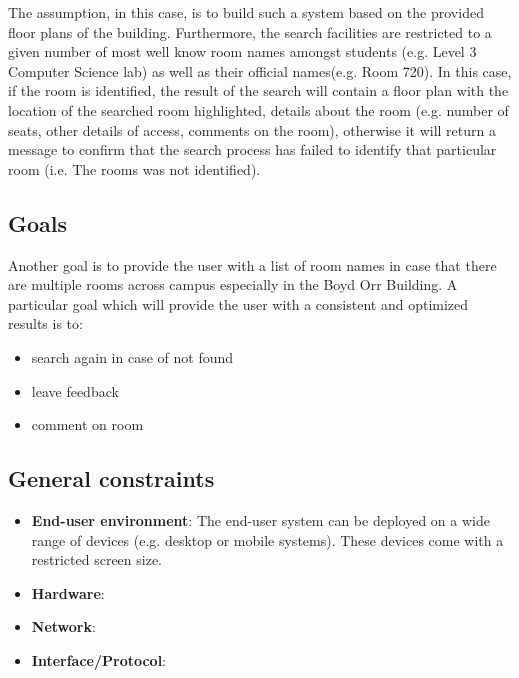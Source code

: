 \documentclass{sig-alt-release2}
\begin{document}
The assumption, in this case, is to build such a system based on the provided
floor plans of the building. Furthermore, the search facilities are restricted
to a given number of most well know room names amongst students (e.g. Level 3
Computer Science lab) as well as their official names(e.g. Room 720). In this
case, if the room is identified, the result of the search will contain a floor
plan with the location of the searched room highlighted, details about the
room (e.g. number of seats, other details of access, comments on the room),
otherwise it will return a message to confirm that the search process has
failed to identify that particular room (i.e. The rooms was not identified).

\subsection{Goals}
Another goal is to provide the user with a list of room names in case that
there are multiple rooms across campus especially in the Boyd Orr Building.
A particular goal which will provide the user with a consistent and optimized
results is to:
\begin{itemize}
	\item  search again in case of not found 
	\item  leave feedback
	\item  comment on room 
\end{itemize}

\subsection{General constraints}
\begin{itemize}
	\item \textbf{End-user environment}: The end-user system can be deployed
	on a wide range of devices (e.g. desktop or mobile systems). These devices
	come with a restricted screen size.
	\item \textbf{Hardware}: 
	\item \textbf{Network}:
	\item \textbf{Interface/Protocol}:
\end{itemize}
\end{document}
